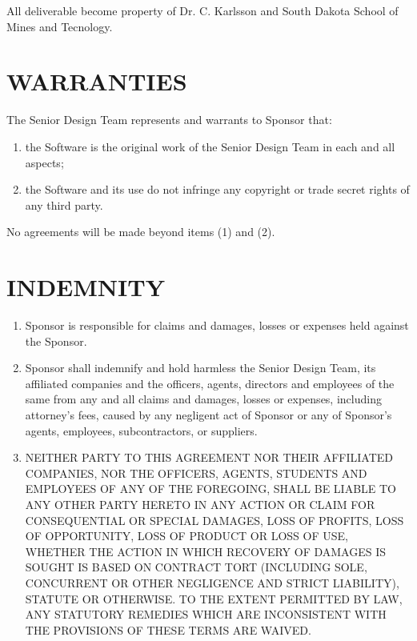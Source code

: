 \documentclass[11pt]{article}
\begin{document}
All deliverable become property of Dr. C. Karlsson and South Dakota School of Mines and Tecnology.

\section{WARRANTIES }  

The Senior Design Team represents and warrants to Sponsor that:         
\begin{enumerate}  \itemsep4pt \parskip0pt 
\item  the Software is the original work of the Senior Design Team in each and all aspects;        

\item the Software and its use do not infringe any copyright or   trade secret rights of any third party.  
\end{enumerate}
No agreements will be made beyond items (1) and (2).

\section{INDEMNITY}   
\begin{enumerate}  \itemsep4pt \parskip0pt 
\item Sponsor is responsible for claims and damages, losses or expenses held against the Sponsor.

\item  Sponsor shall       indemnify and hold harmless the Senior Design Team, its affiliated companies       and the officers, agents, directors and employees of the same from       any and all claims and damages, losses or expenses, including       attorney's fees, caused by any negligent act of Sponsor or any of       Sponsor's agents, employees, subcontractors, or suppliers.    

\item  NEITHER PARTY TO THIS AGREEMENT NOR THEIR AFFILIATED COMPANIES,       NOR THE OFFICERS, AGENTS, STUDENTS AND EMPLOYEES OF ANY OF THE       FOREGOING, SHALL BE LIABLE TO ANY OTHER PARTY HERETO IN ANY ACTION       OR CLAIM FOR CONSEQUENTIAL OR SPECIAL DAMAGES, LOSS OF PROFITS,       LOSS OF OPPORTUNITY, LOSS OF PRODUCT OR LOSS OF USE, WHETHER THE       ACTION IN WHICH RECOVERY OF DAMAGES IS SOUGHT IS BASED ON CONTRACT       TORT (INCLUDING SOLE, CONCURRENT OR OTHER NEGLIGENCE AND STRICT       LIABILITY), STATUTE OR OTHERWISE. TO THE EXTENT PERMITTED BY LAW,       ANY STATUTORY REMEDIES WHICH ARE INCONSISTENT WITH THE PROVISIONS       OF THESE TERMS ARE WAIVED.  
\end{enumerate}
\end{document}
